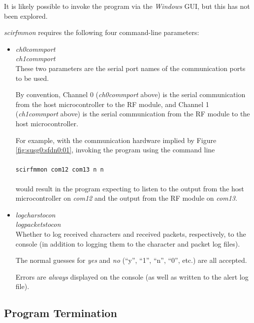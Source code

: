 \documentclass[letterpaper,10pt,titlepage]{article}
\newcommand{\productname}{scirfmmon}
\newcommand{\productnameemph}{\emph{\productname}}
\begin{document}
It is likely possible to invoke the program via the \emph{Windows} GUI,
but this has not been explored.

\productnameemph{} requires the following four command-line parameters:

\begin{itemize}
\item \emph{ch0commport}\\
      \emph{ch1commport}\\
      These two parameters are the serial port names
      of the communication ports to be used.
      
      By convention, Channel 0 (\emph{ch0commport} above) is the serial communication
      from the host microcontroller to the RF module, and Channel 1
      (\emph{ch1commport} above) is the
      serial communication from the RF module to the host microcontroller.

      For example, with the communication hardware implied by 
      Figure \ref{fig:susg0:sfdn0:01}, invoking the program using the
      command line\\\\
      \texttt{\productname{} com12 com13 n n}\\\\
      would result in the program expecting to listen to the output from
      the host microcontroller on \emph{com12} and the output from the
      RF module on \emph{com13}.
\item \emph{logcharstocon}\\
      \emph{logpacketstocon}\\
      Whether to log received characters and received packets, respectively,
      to the console (in addition to logging them to the
      character and packet log files).  

      The normal guesses for \emph{yes} and \emph{no}
      (``y'', ``1'', ``n'', ``0'', etc.) are all accepted.

      Errors are \emph{always} displayed on the console (as well as written to
      the alert log
      file).
\end{itemize}


\subsection{Program Termination}
\label{susg0:sptm0}
\end{document}
